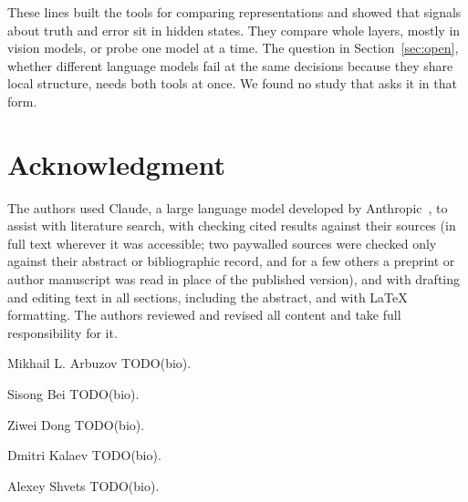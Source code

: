 \documentclass{ieeeaccess}
\begin{document}
These lines built the tools for comparing representations and showed that signals about truth and error sit in hidden states. They compare whole layers, mostly in vision models, or probe one model at a time. The question in Section~\ref{sec:open}, whether different language models fail at the same decisions because they share local structure, needs both tools at once. We found no study that asks it in that form.

\section*{Acknowledgment}
The authors used Claude, a large language model developed by Anthropic~\cite{anthropic2026claude}, to assist with literature search, with checking cited results against their sources (in full text wherever it was accessible; two paywalled sources were checked only against their abstract or bibliographic record, and for a few others a preprint or author manuscript was read in place of the published version), and with drafting and editing text in all sections, including the abstract, and with LaTeX formatting. The authors reviewed and revised all content and take full responsibility for it.




\begin{IEEEbiographynophoto}{Mikhail L. Arbuzov}
TODO(bio).
\end{IEEEbiographynophoto}

\begin{IEEEbiographynophoto}{Sisong Bei}
TODO(bio).
\end{IEEEbiographynophoto}

\begin{IEEEbiographynophoto}{Ziwei Dong}
TODO(bio).
\end{IEEEbiographynophoto}

\begin{IEEEbiographynophoto}{Dmitri Kalaev}
TODO(bio).
\end{IEEEbiographynophoto}

\begin{IEEEbiographynophoto}{Alexey Shvets}
TODO(bio).
\end{IEEEbiographynophoto}

\EOD
\end{document}

